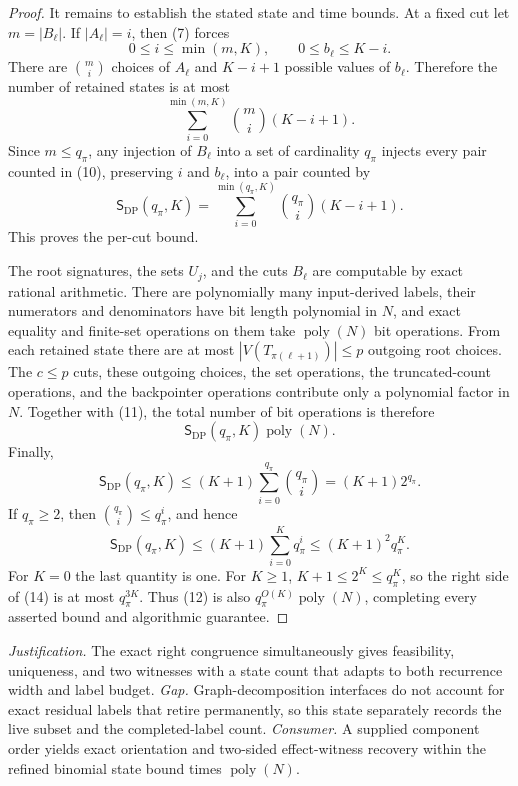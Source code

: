\documentclass{article}
\begin{document}
\begin{proof}
It remains to establish the stated state and time bounds.  At a fixed cut let \(m=|B_\ell|\).  If \(|A_\ell|=i\), then (7) forces
\[
0\leq i\leq\min(m,K),
\qquad
0\leq b_\ell\leq K-i.
\]
There are \(\binom mi\) choices of \(A_\ell\) and \(K-i+1\) possible values of \(b_\ell\).  Therefore the number of retained states is at most
\[
\sum_{i=0}^{\min(m,K)}\binom mi(K-i+1). \tag{10}
\]
Since \(m\leq q_\pi\), any injection of \(B_\ell\) into a set of cardinality \(q_\pi\) injects every pair counted in (10), preserving \(i\) and \(b_\ell\), into a pair counted by
\[
\mathsf S_{\mathrm{DP}}(q_\pi,K)
=\sum_{i=0}^{\min(q_\pi,K)}\binom{q_\pi}{i}(K-i+1). \tag{11}
\]
This proves the per-cut bound.

The root signatures, the sets \(U_j\), and the cuts \(B_\ell\) are computable by exact rational arithmetic.  There are polynomially many input-derived labels, their numerators and denominators have bit length polynomial in \(N\), and exact equality and finite-set operations on them take \(\operatorname{poly}(N)\) bit operations.  From each retained state there are at most \(|V(T_{\pi(\ell+1)})|\leq p\) outgoing root choices.  The \(c\leq p\) cuts, these outgoing choices, the set operations, the truncated-count operations, and the backpointer operations contribute only a polynomial factor in \(N\).  Together with (11), the total number of bit operations is therefore
\[
\mathsf S_{\mathrm{DP}}(q_\pi,K)\operatorname{poly}(N). \tag{12}
\]
Finally,
\[
\mathsf S_{\mathrm{DP}}(q_\pi,K)
\leq (K+1)\sum_{i=0}^{q_\pi}\binom{q_\pi}{i}
=(K+1)2^{q_\pi}. \tag{13}
\]
If \(q_\pi\geq2\), then \(\binom{q_\pi}{i}\leq q_\pi^i\), and hence
\[
\mathsf S_{\mathrm{DP}}(q_\pi,K)
\leq (K+1)\sum_{i=0}^{K}q_\pi^i
\leq (K+1)^2q_\pi^K. \tag{14}
\]
For \(K=0\) the last quantity is one.  For \(K\geq1\), \(K+1\leq2^K\leq q_\pi^K\), so the right side of (14) is at most \(q_\pi^{3K}\).  Thus (12) is also \(q_\pi^{O(K)}\operatorname{poly}(N)\), completing every asserted bound and algorithmic guarantee.
\end{proof}
\par\smallskip\noindent \textit{Justification.} The exact right congruence simultaneously gives feasibility, uniqueness, and two witnesses with a state count that adapts to both recurrence width and label budget. \textit{Gap.} Graph-decomposition interfaces do not account for exact residual labels that retire permanently, so this state separately records the live subset and the completed-label count. \textit{Consumer.} A supplied component order yields exact orientation and two-sided effect-witness recovery within the refined binomial state bound times \(\operatorname{poly}(N)\).
\end{document}
